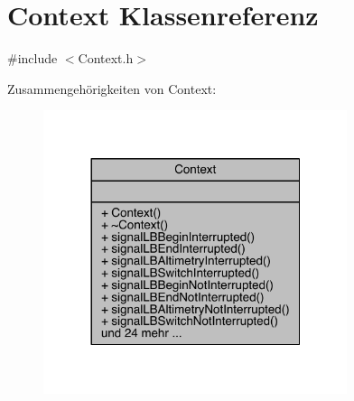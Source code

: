 \hypertarget{class_context}{}\section{Context Klassenreferenz}
\label{class_context}


{\ttfamily \#include $<$Context.\+h$>$}



Zusammengehörigkeiten von Context\+:
\nopagebreak
\begin{figure}[H]
\begin{center}
\leavevmode
\includegraphics[width=252pt]{class_context__coll__graph}
\end{center}
\end{figure}
